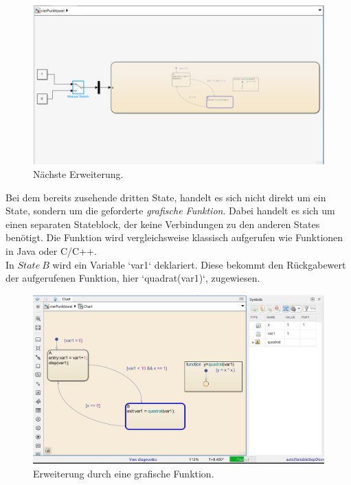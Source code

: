 \documentclass{article}
\begin{document}
		\subsection{}
			\begin{figure}[h]
				\centering
				\includegraphics[scale=0.7]{Aufgabe4.3e.png}
				\caption{Nächste Erweiterung.}
				\label{fig_11: Aufg_3e}
			\end{figure}
			Bei dem bereits zusehende dritten State, handelt es sich nicht direkt um ein State, sondern um die geforderte \textit{grafische Funktion}. Dabei handelt es sich um einen separaten Stateblock, der keine Verbindungen zu den anderen States benötigt. Die Funktion wird vergleichsweise klassisch aufgerufen wie Funktionen in Java oder C/C++. \\
			In $State\ B$ wird ein Variable `var1` deklariert. Diese bekommt den Rückgabewert der aufgerufenen Funktion, hier `quadrat(var1)`, zugewiesen.
			\begin{figure}[h]
				\centering
				\includegraphics[scale=0.7]{Aufgabe4.3eChart.png}
				\caption{Erweiterung durch eine grafische Funktion.}
				\label{fig_12: Aufg_3e_Chart}
			\end{figure}
\clearpage
\newpage
\end{document}

